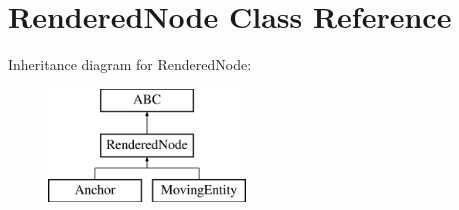 \hypertarget{class_rendering_1_1_rendered_node}{}\section{Rendered\+Node Class Reference}
\label{class_rendering_1_1_rendered_node}
Inheritance diagram for Rendered\+Node\+:\begin{figure}[H]
\begin{center}
\leavevmode
\includegraphics[height=3.000000cm]{class_rendering_1_1_rendered_node}
\end{center}
\end{figure}
